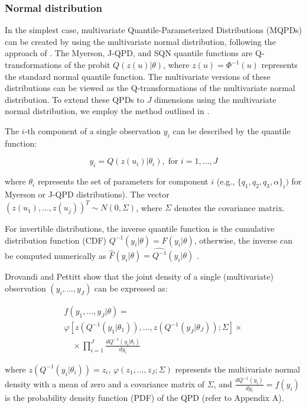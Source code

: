 \documentclass[
  fleqn,
  deca,
  blindrev
]{informs4}
\begin{document}
\subsubsection{Normal distribution}\label{normal-distribution}

In the simplest case, multivariate Quantile-Parameterized Distributions
(MQPDs) can be created by using the multivariate normal distribution,
following the approach of \citep{hoff2007ExtendingRankLikelihood}. The
Myerson, J-QPD, and SQN quantile functions are Q-transformations of the
probit \(Q(z(u)\vert\theta)\), where \(z(u)=\Phi^{-1}(u)\) represents
the standard normal quantile function. The multivariate versions of
these distributions can be viewed as the Q-transformations of the
multivariate normal distribution. To extend these QPDs to \(J\)
dimensions using the multivariate normal distribution, we employ the
method outlined in \citep{drovandi2011LikelihoodfreeBayesianEstimation}.

The \(i\)-th component of a single observation \(y_i\) can be described
by the quantile function:

\[
y_i=Q(z(u_i)\vert\theta_i), \; \text{for }i=1,\dots,J 
\]

where \(\theta_i\) represents the set of parameters for component \(i\)
(e.g., \(\{q_1,q_2,q_3, \alpha\}_i)\) for Myerson or J-QPD
distributions). The vector \((z(u_1),\dots,z(u_j))^T\sim N(0,\Sigma)\),
where \(\Sigma\) denotes the covariance matrix.

For invertible distributions, the inverse quantile function is the
cumulative distribution function (CDF)
\(Q^{-1}(y_i\vert\theta)=F(y_i\vert\theta)\), otherwise, the inverse can
be computed numerically as
\(\widehat{F}(y_i\vert\theta)=\widehat{Q^{-1}}(y_i\vert\theta)\)
\citep{perepolkin2023TenetsQuantilebasedInference}.

Drovandi and Pettitt
\citep{drovandi2011LikelihoodfreeBayesianEstimation} show that the joint
density of a single (multivariate) observation \((y_i,\dots,y_J)\) can
be expressed as:

\[
\begin{gathered}
f(y_1,\dots,y_J\vert\theta)=\\
\varphi\left[z(Q^{-1}(y_1\vert\theta_1)),\dots,z(Q^{-1}(y_J\vert\theta_J));\Sigma\right]\times\\
\quad \times\prod_{i=1}^{J}\frac{dQ^{-1}(y_i\vert\theta_i)}{dy_i}
\end{gathered}
\]

where \(z(Q^{-1}(y_i\vert\theta_i))=z_i\),
\(\varphi(z_1,\dots,z_J;\Sigma)\) represents the multivariate normal
density with a mean of zero and a covariance matrix of \(\Sigma\), and
\(\frac{dQ^{-1}(y_i)}{dy_i}=f(y_i)\) is the probability density function
(PDF) of the QPD (refer to Appendix A).
\end{document}

